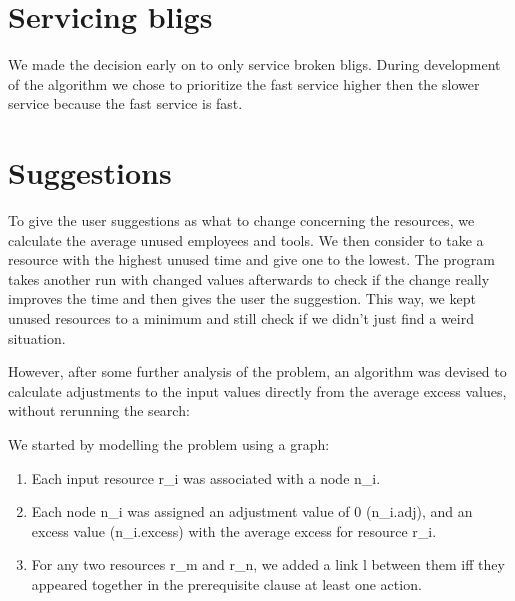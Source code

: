 \documentclass{article}
\begin{document}
\section*{Servicing bligs}
We made the decision early on to only service broken bligs. During development of the algorithm we chose to prioritize the fast service higher then the slower service because the fast service is fast.

\section*{Suggestions}
To give the user suggestions as what to change concerning the resources, we calculate the average unused employees and tools. We then consider to take a resource with the highest unused time and give one to the lowest. The program takes another run with changed values afterwards to check if the change really improves the time and then gives the user the suggestion.
This way, we kept unused resources to a minimum and still check if we didn't just find a weird situation.

However, after some further analysis of the problem, an algorithm was devised to calculate adjustments to the input values directly from the average excess values, without rerunning the search:

We started by modelling the problem using a graph:
\begin{enumerate}
	\item Each input resource r_i was associated with a node n_i.
	\item Each node n_i was assigned an adjustment value of 0 (n_{i}.adj), and an excess value (n_{i}.excess) with the average excess for resource r_i.
	\item For any two resources r_m and r_n, we added a link l between them iff they appeared together in the prerequisite clause at least one action.
\end{enumerate}
\end{document}
